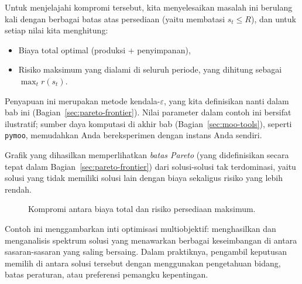 Untuk menjelajahi kompromi tersebut, kita menyelesaikan masalah ini berulang kali dengan berbagai batas atas persediaan (yaitu membatasi \(s_t \leq R\)), dan untuk setiap nilai kita menghitung:
\begin{itemize}
    \item Biaya total optimal (produksi + penyimpanan),
    \item Risiko maksimum yang dialami di seluruh periode, yang dihitung sebagai \( \max_t r(s_t) \).
\end{itemize}

Penyapuan ini merupakan metode kendala-$\varepsilon$, yang kita definisikan nanti dalam bab ini (Bagian~\ref{sec:pareto-frontier}). Nilai parameter dalam contoh ini bersifat ilustratif; sumber daya komputasi di akhir bab (Bagian~\ref{sec:moo-tools}), seperti \texttt{pymoo}, memudahkan Anda bereksperimen dengan instans Anda sendiri.

Grafik yang dihasilkan memperlihatkan \emph{batas Pareto} (yang didefinisikan secara tepat dalam Bagian~\ref{sec:pareto-frontier}) dari solusi-solusi tak terdominasi, yaitu solusi yang tidak memiliki solusi lain dengan biaya sekaligus risiko yang lebih rendah.

\begin{figure}[h]
    \centering
    \caption{Kompromi antara biaya total dan risiko persediaan maksimum.}
\end{figure}

Contoh ini menggambarkan inti optimisasi multiobjektif: menghasilkan dan menganalisis spektrum solusi yang menawarkan berbagai keseimbangan di antara sasaran-sasaran yang saling bersaing. Dalam praktiknya, pengambil keputusan memilih di antara solusi tersebut dengan menggunakan pengetahuan bidang, batas peraturan, atau preferensi pemangku kepentingan.

